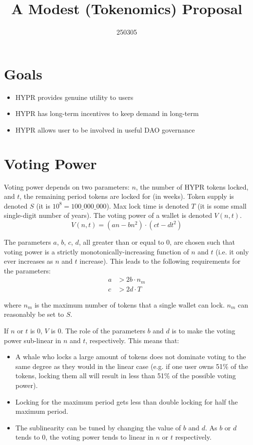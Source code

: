 \documentclass{article}
\title{A Modest (Tokenomics) Proposal}
\date{250305}
\author{}
\begin{document}
\maketitle

\section{Goals}
\begin{itemize}
    \item HYPR provides genuine utility to users
    \item HYPR has long-term incentives to keep demand in long-term
    \item HYPR allows user to be involved in useful DAO governance
\end{itemize}

\section{Voting Power}

Voting power depends on two parameters: $n$, the number of HYPR tokens locked, and $t$, the remaining period tokens are locked for (in weeks).
Token supply is denoted $S$ (it is $10^8 = 100\_000\_000$).
Max lock time is denoted $T$ (it is some small single-digit number of years).
The voting power of a wallet is denoted $V(n, t)$.
\begin{equation}
V(n, t) = (an - bn^2) \cdot (ct - dt^2)
\end{equation}

The parameters $a$, $b$, $c$, $d$, all greater than or equal to $0$, are chosen such that voting power is a strictly monotonically-increasing function of $n$ and $t$ (i.e. it only ever increases as $n$ and $t$ increase).
This leads to the following requirements for the parameters:
\begin{align}
a &> 2b \cdot n_m\\
c &> 2d \cdot T
\end{align}

where $n_m$ is the maximum number of tokens that a single wallet can lock.
$n_m$ can reasonably be set to $S$.

If $n$ or $t$ is $0$, $V$ is $0$.
The role of the parameters $b$ and $d$ is to make the voting power sub-linear in $n$ and $t$, respectively.
This means that:
\begin{itemize}
    \item A whale who locks a large amount of tokens does not dominate voting to the same degree as they would in the linear case (e.g. if one user owns 51\% of the tokens, locking them all will result in less than 51\% of the possible voting power).
    \item Locking for the maximum period gets less than double locking for half the maximum period.
    \item The sublinearity can be tuned by changing the value of $b$ and $d$.
      As $b$ or $d$ tends to $0$, the voting power tends to linear in $n$ or $t$ respectively.
\end{itemize}
\end{document}
